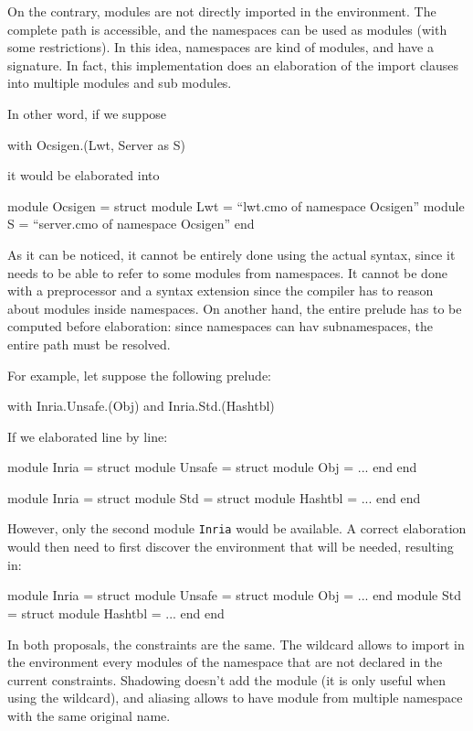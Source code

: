 On the contrary, modules are not directly imported in the environment. The
complete path is accessible, and the namespaces can be used as modules (with
some restrictions). In this idea, namespaces are kind of modules, and have a
signature. In fact, this implementation does an elaboration of the import
clauses into multiple modules and sub modules.

In other word, if we suppose
\begin{OCaml}
with Ocsigen.(Lwt, Server as S)
\end{OCaml}
it would be elaborated into
\begin{OCaml}
module Ocsigen = struct
  module Lwt = ``lwt.cmo of namespace Ocsigen''
  module S = ``server.cmo of namespace Ocsigen''
end
\end{OCaml}

As it can be noticed, it cannot be entirely done using the actual syntax, since
it needs to be able to refer to some modules from namespaces. It cannot be done
with a preprocessor and a syntax extension since the compiler has to reason
about modules inside namespaces. On another hand, the entire prelude has to be
computed before elaboration: since namespaces can hav subnamespaces, the entire
path must be resolved.

For example, let suppose the following prelude:
\begin{OCaml}
with Inria.Unsafe.(Obj)
and Inria.Std.(Hashtbl)
\end{OCaml}
If we elaborated line by line:
\begin{OCaml}
module Inria = struct
  module Unsafe = struct
    module Obj = ...
  end
end

module Inria = struct
  module Std = struct
    module Hashtbl = ...
  end
end

\end{OCaml}
However, only the second module \texttt{Inria} would be available. A correct
elaboration would then need to first discover the environment that will be
needed, resulting in:
\begin{OCaml}
module Inria = struct
  module Unsafe = struct
    module Obj = ...
  end
  module Std = struct
    module Hashtbl = ...
  end
end
\end{OCaml}


\medskip

In both proposals, the constraints are the same. The wildcard allows to import
in the environment every modules of the namespace that are not declared in the
current constraints. Shadowing doesn't add the module (it is only useful when
using the wildcard), and aliasing allows to have module from multiple namespace
with the same original name.

